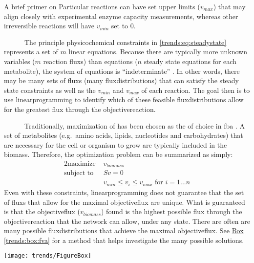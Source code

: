 \begin{pabox}[label=trends:box:fba]{A brief primer on }
Particular reactions can have set upper limits ($v_{max}$) that 
may align closely with experimental enzyme capacity measurements, 
whereas other irreversible reactions will have $v_{min}$ set to 0.

~~~~~~The principle physicochemical constraints in \autoref{trends:eq:steadystate} 
represents a set of $m$ linear equations. 
Because there are typically more unknown variables ($m$ reaction \glspl{flux}) than equations ($n$ steady state
equations for each metabolite), the system of equations is ``indeterminate'' \cite{Lee:2006je}.
In other words, there may be many sets of \glspl{flux} (many \glspl{fluxdistribution}) that 
can satisfy the steady state constraints as well as the $v_{min}$ and $v_{max}$ of each reaction.
The goal then is to use \gls{linearprogramming} to identify which of these feasible \glspl{fluxdistribution}
allow for the greatest \gls{flux} through the \gls{objectivereaction}.

~~~~~~Traditionally, maximization of  has been 
chosen as the  of choice in \gls{fba} \cite{Lee:2006je}. A set 
of metabolites (e.g.\ amino acids, lipids, nucleotides and 
carbohydrates) that are necessary for the cell or organism 
to grow are typically included in the \gls{biomass}. 
Therefore, the optimization problem can be summarized as simply:
\begin{alignat*}{2}
\text{maximize  }   & v_{biomass}  \\
\text{subject to  } & Sv=0 \\
                   & v_{min} \leq v_i \leq v_{max} \text{ for } i=1...n
\end{alignat*}
Even with these constraints, \gls{linearprogramming} does not guarantee that the set of \glspl{flux} that
allow for the maximal \gls{objectiveflux} are unique. What is 
guaranteed is that the \gls{objectiveflux} ($v_{biomass}$) found is the
highest possible \gls{flux} through the \gls{objectivereaction} that the network can allow, under any state.
There are often are many possible \glspl{fluxdistribution} that achieve
the maximal \gls{objectiveflux}. See \hyperref[trends:box:fva]{Box \ref{trends:box:fva}} for
a method that helps investigate the many possible solutions.


  \centering
  \texttt{[image: trends/FigureBox]}
  \label{trends:figbox}

\end{pabox}